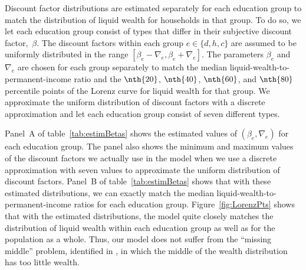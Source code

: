 \documentclass[\econtexRoot/HAFiscal]{subfiles}
\begin{document}
Discount factor distributions are estimated separately for each education group to match the distribution of liquid wealth for households in that group.
To do so, we let each education group consist of types that differ in their subjective discount factor,~$\beta$.
The discount factors within each group $e\in \{d, h, c\}$ are assumed to be uniformly distributed in the range $[\beta_e-\nabla_e, \beta_e+\nabla_e]$.
The parameters $\beta_e$ and $\nabla_e$ are chosen for each group separately to match the median liquid-wealth-to-permanent-income ratio and the $\nth{20}$, $\nth{40}$, $\nth{60}$, and $\nth{80}$ percentile points of the Lorenz curve for liquid wealth for that group.
We approximate the uniform distribution of discount factors with a discrete approximation and let each education group consist of seven different types.

Panel~A of table~\ref{tab:estimBetas} shows the estimated values of $(\beta_e, \nabla_e)$ for each education group.
The panel also shows the minimum and maximum values of the discount factors we actually use in the model when we use a discrete approximation with seven values to approximate the uniform distribution of discount factors.
Panel~B of table~\ref{tab:estimBetas} shows that with these estimated distributions, we can exactly match the median liquid-wealth-to-permanent-income ratios for each education group.
Figure~\ref{fig:LorenzPts} shows that with the estimated distributions, the model quite closely matches the distribution of liquid wealth within each education group as well as for the population as a whole.
Thus, our model does not suffer from the ``missing middle'' problem, identified in \cite{kaplanMPC2022}, in which the middle of the wealth distribution has too little wealth.

\end{document}
